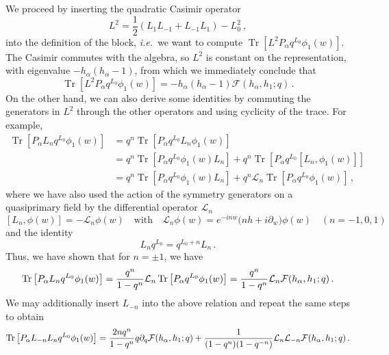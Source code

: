 \documentclass[12pt]{article}
\def\Lc{\mathcal{L}}
\def\p{\partial}
\newcommand{\ie}{{\it i.e.~}}
\DeclareMathOperator{\Tr}{Tr}
\begin{document}
We proceed by inserting the quadratic Casimir operator
\begin{equation}
\label{Casimira}
 L^2=\frac{1}{2}(L_1L_{-1}+L_{-1}L_1)-L_0^2~,
\end{equation}
into the definition of the block, \ie we want to compute $\Tr \left[L^2 P_{\alpha}q^{L_0}\phi_1(w)\right]$. The Casimir commutes with the algebra, so $L^2$ is constant on the representation, with eigenvalue $-h_\alpha(h_\alpha-1)$, from which we immediately conclude that
%
\begin{equation}
\label{Casimirb}
 \Tr \left[L^2 P_{\alpha}q^{L_0}\phi_1(w)\right] = -h_\alpha(h_\alpha-1)\mathcal{F}(h_{\alpha},h_1;q)\,.
\end{equation}
%
On the other hand, we can also derive some identities by commuting the generators in $L^2$ through the other operators and using cyclicity of the trace.  For example, %
\begin{align}
	 \Tr\left[P_\alpha L_n  q^{L_0} \phi_1(w)\right] &= q^n\Tr\left[ P_\alpha q^{L_0}L_n \phi_1(w)\right]\nonumber\\
&= q^n\Tr \left[ P_\alpha q^{L_0} \phi_1(w)L_n\right]  +q^n\Tr\left[P_\alpha q^{L_0}[L_n ,\phi_1(w)]\right]\nonumber\\
&=  q^n\Tr \left[ P_\alpha q^{L_0} \phi_1(w)L_n\right]  +q^n\Lc_n\Tr \left[ P_\alpha q^{L_0}\phi_1(w)\right] \,,
\end{align}
where we have also used the action of the symmetry generators on a quasiprimary field by the differential operator $\Lc_n$
\begin{equation}
\label{eq:cylLn}
 [L_n,\phi(w)] =-\Lc_n \phi(w)\quad \text{with}\quad  \Lc_n \phi(w)=e^{-inw} \big( nh +i \p_w\big)\phi(w)\quad (n=-1,0,1)
\end{equation}
and the identity
\begin{equation}\label{eq:useful}
L_n q^{L_0} = q^{L_0+n} L_n \,.
\end{equation}
 Thus, we have shown that for $n=\pm 1$, we have
\begin{equation}
 \Tr \big[P_\alpha L_n q^{L_0} \phi_1(w)\big] = {q^n \over 1-q^n} \Lc_n  \Tr \big[P_\alpha q^{L_0}\phi_1(w)\big]
 = {q^n \over 1-q^n} \Lc_n \mathcal{F}(h_{\alpha},h_1;q)
 \,.
\end{equation}
%
We may additionally insert $L_{-n}$ into the above relation and repeat the same steps to obtain
%
\begin{equation}
 \Tr \big[P_\alpha L_{-n} L_n q^{L_0} \phi_1(w)\big] =  {2nq^n \over 1-q^n}q\p_q  \mathcal{F}(h_{\alpha},h_1;q)
 +{1\over (1-q^n)(1-q^{-n})}\Lc_n\Lc_{-n}
  \mathcal{F}(h_{\alpha},h_1;q)\,.
\end{equation}
\end{document}
